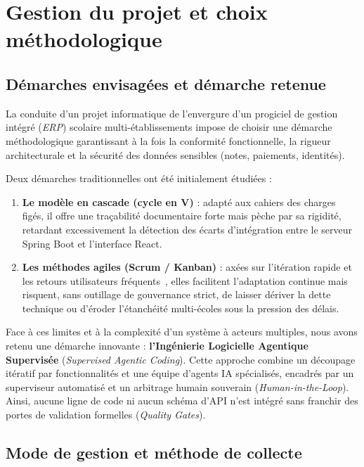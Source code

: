 \chapter{Gestion du projet et choix méthodologique}

\section{Démarches envisagées et démarche retenue}

La conduite d'un projet informatique de l'envergure d'un progiciel de gestion intégré (\emph{ERP}) scolaire multi-établissements impose de choisir une démarche méthodologique garantissant à la fois la conformité fonctionnelle, la rigueur architecturale et la sécurité des données sensibles (notes, paiements, identités).

Deux démarches traditionnelles ont été initialement étudiées :
\begin{enumerate}
    \item \textbf{Le modèle en cascade (cycle en V)} : adapté aux cahiers des charges figés, il offre une traçabilité documentaire forte mais pèche par sa rigidité, retardant excessivement la détection des écarts d'intégration entre le serveur Spring Boot et l'interface React.
    \item \textbf{Les méthodes agiles (Scrum / Kanban)} : axées sur l'itération rapide et les retours utilisateurs fréquents~\cite{beck2001agile}, elles facilitent l'adaptation continue mais risquent, sans outillage de gouvernance strict, de laisser dériver la dette technique ou d'éroder l'étanchéité multi-écoles sous la pression des délais.
\end{enumerate}

Face à ces limites et à la complexité d'un système à acteurs multiples, nous avons retenu une démarche innovante : \textbf{l'Ingénierie Logicielle Agentique Supervisée} (\emph{Supervised Agentic Coding}). Cette approche combine un découpage itératif par fonctionnalités et une équipe d'agents IA spécialisés, encadrés par un superviseur automatisé et un arbitrage humain souverain (\emph{Human-in-the-Loop}). Ainsi, aucune ligne de code ni aucun schéma d'API n'est intégré sans franchir des portes de validation formelles (\emph{Quality Gates}).

\section{Mode de gestion et méthode de collecte}

